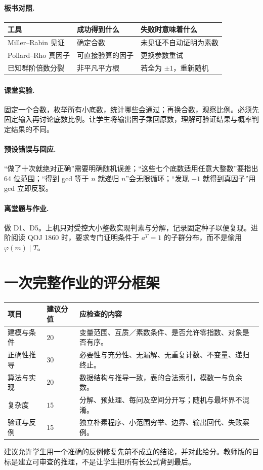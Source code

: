 \paragraph{板书对照.}
\begin{center}
\begin{tabular}{lll}
\toprule
工具 & 成功得到什么 & 失败时意味着什么\\\midrule
Miller--Rabin 见证 & 确定合数 & 未见证不自动证明为素数\\
Pollard--Rho 真因子 & 可直接验算的因子 & 更换参数重试\\
已知群阶倍数分裂 & 非平凡平方根 & 若全为 $\pm1$，重新随机\\\bottomrule
\end{tabular}
\end{center}
\paragraph{课堂实验.} 固定一个合数，枚举所有小底数，统计哪些会通过；再换合数，观察比例。必须先固定输入再讨论底数比例。让学生将输出因子乘回原数，理解可验证结果与概率判定结果的不同。
\paragraph{预设错误与回应.} “做了十次就绝对正确”需要明确随机误差；“这些七个底数适用任意大整数”要指出 $64$ 位范围；“得到 gcd 等于 $n$ 就递归 $n$”会无限循环；“发现 $-1$ 就得到真因子”用 gcd 立即反驳。
\paragraph{离堂题与作业.} 做 D1、D5。上机只对受控大小整数实现判素与分解，记录固定种子以便复现。进阶阅读 QOJ 1860 时，要求专门证明条件于 $a^T=1$ 的子群分布，而不是偷用 $\varphi(m)\mid T$。

\section{一次完整作业的评分框架}
\begin{longtable}{p{}p{}p{}}
\toprule
项目 & 建议分值 & 应检查的内容\\\midrule
建模与条件 & $20$ & 变量范围、互质／素数条件、是否允许零指数、对象是否有序。\\
正确性推导 & $30$ & 必要性与充分性、无漏解、无重复计数、不变量、递归终止。\\
算法与实现 & $20$ & 数据结构与推导一致，表的合法索引，模数一与负余数。\\
复杂度 & $15$ & 分解、预处理、每问及空间分开写；随机与最坏界不混淆。\\
验证与反例 & $15$ & 独立朴素程序、小范围穷举、边界、输出回代、失败案例。\\\bottomrule
\end{longtable}
建议允许学生用一个准确的反例修复先前不成立的结论，并对此给分。教师版的目标是建立可审查的推理，不是让学生把所有长公式背到最后。

